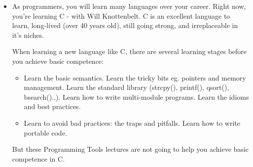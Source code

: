 \documentclass[aspectratio=169]{beamer}
\begin{document}
\begin{frame}
\large
      \begin{itemize}
      \item
      As programmers, you will learn \alert{many languages} over your career.
      Right now, you're learning C - with Will Knottenbelt.
      \pause
      C is an excellent language to learn, long-lived (over 40 years old),
      still going strong, and \alert{irreplaceable in it's niches}.

      \pitem
      When learning a new language like C, there are \alert{several learning stages}
      before you achieve \alert{basic competence}:

      \begin{itemize}
      \pitem
        Learn the \alert{syntax}.
      \item
        Learn the \alert{basic semantics}.
      \pitem
        Learn the tricky bits
        eg. \alert{pointers and memory management}.
      \pitem
        Learn the \alert{standard library
	(strcpy(), printf(), qsort(), bsearch()..)}.
      \pitem
        Learn how to write \alert{multi-module programs}.
      \pitem
        Learn the \alert{idioms} and \alert{best practices}.
      \item
        Learn to avoid \alert{bad practices}: the \alert{traps} and \alert{pitfalls}.
      \pitem
        Learn how to write \alert{portable code}.
      \end{itemize}

      \pitem
      But these Programming Tools lectures are not going to help you achieve basic competence in C.

      \end{itemize}

\end{frame}
\end{document}
